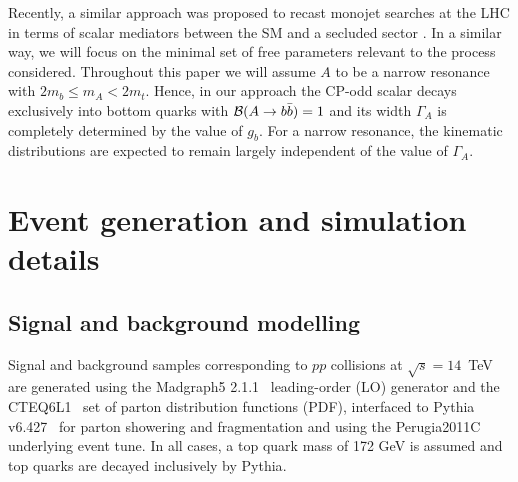 \documentclass[preprintnumbers,superscriptaddress,nofootinbib,aps,prd,floatfix]{revtex4}
\begin{document}
Recently, a similar approach was proposed to recast monojet searches at the LHC in terms of scalar mediators between the SM and a secluded sector \cite{Buckley:2014fba,Harris:2014hga,Haisch:2015ioa,Khoze:2015sra}. In a similar way, we will focus on the minimal set of free parameters relevant to the process considered. Throughout this paper we will assume $A$ to be a narrow resonance with $2 m_b \leq m_A < 2m_t$. Hence, in our approach the CP-odd scalar decays exclusively into bottom quarks with ${\cal B}(A\to b\bar{b})=1$ and its width $\Gamma_A$ is completely determined by the value of $g_b$. 
For a narrow resonance, the kinematic distributions are expected to remain largely independent of the value of $\Gamma_A$.

\section{Event generation and simulation details}
\label{sec:generation}

\subsection{Signal and background modelling}

Signal and background samples corresponding to $pp$ collisions at $\sqrt{s}=14$~TeV are generated using 
the {\sc Madgraph5} 2.1.1~\cite{Alwall:2011uj} leading-order (LO) generator and the  CTEQ6L1~\cite{Nadolsky:2008zw}  
set of parton distribution functions (PDF), interfaced to {\sc Pythia} v6.427~\cite{Sjostrand:2006za}  for parton 
showering and fragmentation and using the Perugia2011C~\cite{Skands:2010ak}  underlying event tune. In all cases, a top quark mass 
of 172 GeV is assumed and top quarks are decayed inclusively by {\sc Pythia}. 
\end{document}
